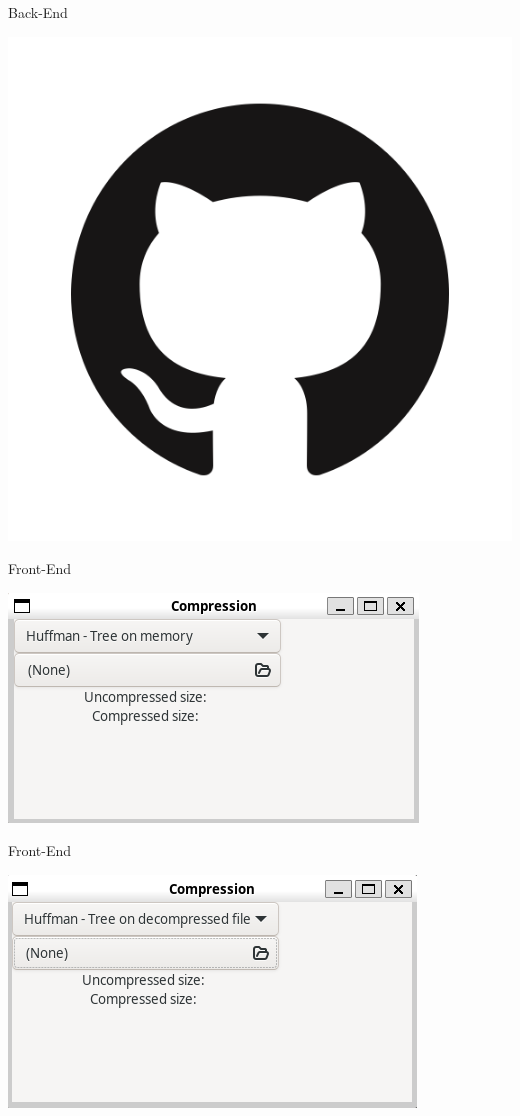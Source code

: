 \documentclass{beamer}
\begin{document}
\begin{frame}{Back-End}
    \begin{center}
        \href{{https://github.com/guhkadoo/unesp/tree/main/Projeto\%20e\%20Implementa\%C3\%A7\%C3\%A3o\%20de\%20Sistemas/GKompress}}{
            \includegraphics[width=0.5\linewidth]{imagens/github}
        }
    \end{center}
\end{frame}

\begin{frame}{Front-End}
    \begin{center}
        \href{https://youtu.be/l5vd6v1kVy0}{
            \includegraphics[width=0.7\linewidth]{imagens/imagem1}
        }
    \end{center}
\end{frame}

\begin{frame}{Front-End}
    \begin{center}
        \href{https://youtu.be/u9ARyP\_xsv8}{
            \includegraphics[width=0.7\linewidth]{imagens/imagem2}
        }
    \end{center}
\end{frame}
\end{document}
